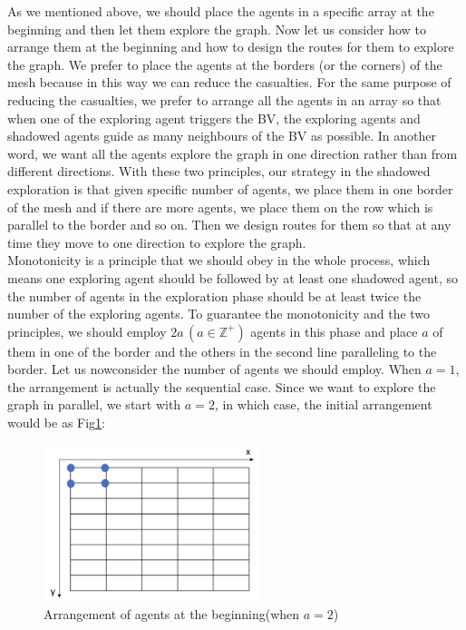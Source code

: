 As we mentioned above, we should place the agents in a specific array at the beginning and then let them explore the graph. Now let us consider how to arrange them at the beginning and how to design the routes for them to explore the graph. We prefer to place the agents at the borders (or the corners) of the mesh because in this way we can reduce the casualties. For the same purpose of reducing the casualties, we prefer to arrange all the agents in an array so that when one of the exploring agent triggers the BV, the exploring agents and shadowed agents guide as many neighbours of the BV as possible. In another word, we want all the agents explore the graph in one direction rather than   from different directions. With these two principles, our strategy in the shadowed exploration is that given specific number of agents, we place them in one border of the mesh and if there are more agents, we place them on the row which is parallel to the border and so on. Then we design routes for them so that at any time they move to one direction to explore the graph. \\
Monotonicity is a principle that we should obey in the whole process, which means one exploring agent should be followed by at least one shadowed agent, so the number of agents in the exploration phase should be at least twice the number of the exploring agents. To guarantee the monotonicity and the two principles, we should employ $2a\,(a\in\mathbb{Z}^+)$ agents in this phase and place $a$ of them in one of the border and the others in the second line paralleling to the border.
Let us nowconsider the number of agents we should employ.
When $a=1$, the arrangement is actually the sequential case. Since we want to explore the graph in parallel,  we start with  $a=2$, in which case, the initial arrangement would be as Fig\ref{fig:twoagent1}:
\begin{figure}[H]
  \centering  
  \includegraphics[width=2.5in]{figures/twoagent1.png}
  \caption{Arrangement of agents at the beginning(when $a=2$)}\label{fig:twoagent1}
\end{figure}

